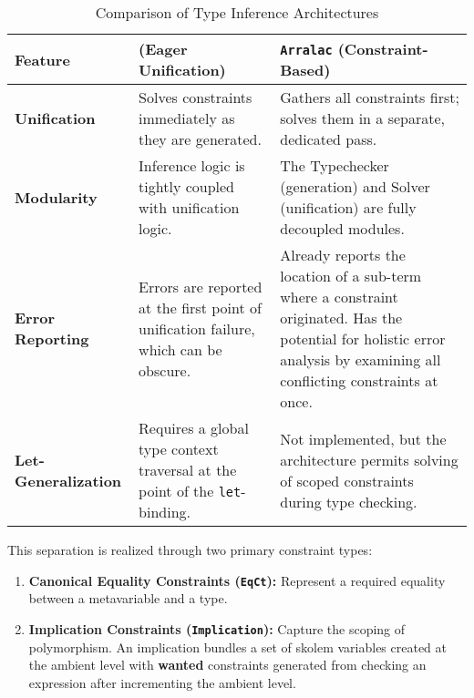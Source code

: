 \begin{table}[h!]
    \centering
    \small
    \caption{Comparison of Type Inference Architectures}
    \label{tab:arch-comparison}
    \begin{tabular}{p{} p{} p{}}
        \toprule
        \textbf{Feature}            & \textbf{\cite{jones-practical-2007} (Eager Unification)}                             & \textbf{\texttt{Arralac} (Constraint-Based)}                                                                                                                              \\
        \midrule
        \textbf{Unification}        & Solves constraints immediately as they are generated.                                & Gathers all constraints first; solves them in a separate, dedicated pass.                                                                                                 \\
        \textbf{Modularity}         & Inference logic is tightly coupled with unification logic.                           & The Typechecker (generation) and Solver (unification) are fully decoupled modules.                                                                                        \\
        \textbf{Error Reporting}    & Errors are reported at the first point of unification failure, which can be obscure. & Already reports the location of a sub-term where a constraint originated. Has the potential for holistic error analysis by examining all conflicting constraints at once. \\
        \textbf{Let-Generalization} & Requires a global type context traversal at the point of the \texttt{let}-binding.   & Not implemented, but the architecture permits solving of scoped constraints during type checking.                                                                      \\
        \bottomrule
    \end{tabular}
\end{table}

\newpage
This separation is realized through two primary constraint types:
\begin{enumerate}
    \item \textbf{Canonical Equality Constraints (\texttt{EqCt}):} Represent a required equality between a metavariable and a type.
    \item \textbf{Implication Constraints (\texttt{Implication}):} Capture the scoping of polymorphism. An implication bundles a set of skolem variables created at the ambient level with \textbf{wanted} \cite{wits-type-inference-using-constraints} constraints generated from checking an expression after incrementing the ambient level.
\end{enumerate}

